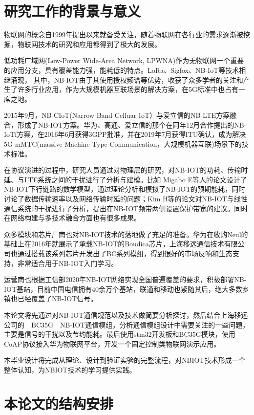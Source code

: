 \thesischapterexordium

\section{研究工作的背景与意义}

物联网的概念自1999年提出以来就备受关注，随着物联网在各行业的需求逐渐被挖掘，物联网技术的研究和应用都得到了极大的发展。


低功耗广域网(Low-Power Wide-Area Network, LPWNA)作为无物联网一个重要的应用分支，具有覆盖能力强，能耗低的特点。LoRa、Sigfox、NB-IoT等技术相继涌现\cite{hbydjs201905115}，
其中，NB-IOT由于其使用授权频谱等优势，收获了众多学者的关注和产生了许多行业应用，作为大规模机器互联场景的解决方案，在5G标准中也占有一席之地。

2015年9月，NB-CIoT(Narrow Band Celluar IoT）与爱立信的NB-LTE方案融合，形成了NB-IOT方案。华为、高通、爱立信的那个在同年12月合作提出的NB-IoTf方案，在2016年6月获得3GPP批准，并在2019年7月获得ITU确认，成为解决5G mMTC(massive Machine Type Communication，大规模机器互联)场景下的技术标准。

在协议演进的过程中，研究人员通过对物理层的研究，对NB-IOT的功耗、传输时延、与LTE系统之间的干扰进行了分析与建模。比如 Migabo E等人的论文\cite{8010279}设计了NB-IOT下行链路的数学模型，通过理论分析和模拟了NB-IOT的预期能耗，同时讨论了数据传输速率以及网络传输时延的问题；Kim H等的论文\cite{8539658,8436641}对NB-IOT与线性通信系统的干扰进行了分析，提出在NB-IOT频带两侧设置保护带宽的建议。同时在网络构建与多技术融合方面也有很多成果。

众多模块和芯片厂商也对NB-IOT技术的落地做了充足的准备。华为在收购Neul的基础上在2016年就展示了承载NB-IOT的Boudica芯片，上海移远通信技术有限公司也通过搭载该系列芯片开发出了BC系列模组，得到很好的市场反响和生态支持，非常适合用于NB-IOT入门学习。

运营商也根据工信部2020年NB-IOT网络实现全国普遍覆盖的要求，积极部署NB-IOT基站，目前中国电信拥有40余万个基站\cite{le2020zhong}，联通和移动也紧随其后，绝大多数乡镇也已经覆盖了NB-IOT信号。

本论文将先通过对NB-IOT通信规范以及技术做简要分析探讨，然后结合上海移远公司的　BC35G　NB-IOT通信模组，分析通信模组设计中需要关注的一些问题，主要是信号的干扰以及节约能耗。最后使用stm32开发板和BC35G模块，使用CoAP协议接入华为物联网平台，开发一个固定控制类物联网演示应用。

本毕业设计将完成从理论、设计到验证实验的完整流程，对NBIOT技术形成一个整体认知，为NBIOT技术的学习提供实践。

\section{本论文的结构安排}

